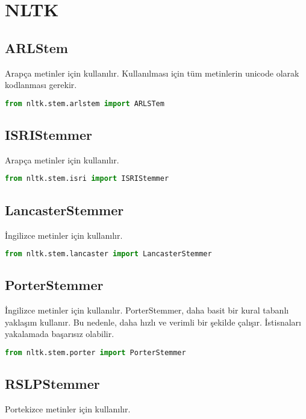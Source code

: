 \section{NLTK}

\subsection{ARLStem}
Arapça metinler için kullanılır. Kullanılması için tüm metinlerin unicode olarak kodlanması gerekir.

\begin{lstlisting}[language=Python]
from nltk.stem.arlstem import ARLSTem
\end{lstlisting}

\subsection{ISRIStemmer}
Arapça metinler için kullanılır.

\begin{lstlisting}[language=Python]
from nltk.stem.isri import ISRIStemmer
\end{lstlisting}

\subsection{LancasterStemmer}
İngilizce metinler için kullanılır.

\begin{lstlisting}[language=Python]
from nltk.stem.lancaster import LancasterStemmer
\end{lstlisting}

\subsection{PorterStemmer}
İngilizce metinler için kullanılır. PorterStemmer, daha basit bir kural tabanlı yaklaşım kullanır. Bu nedenle, daha hızlı ve verimli bir şekilde çalışır. İstisnaları yakalamada başarısız olabilir.

\begin{lstlisting}[language=Python]
from nltk.stem.porter import PorterStemmer
\end{lstlisting}

\subsection{RSLPStemmer}
Portekizce metinler için kullanılır.

